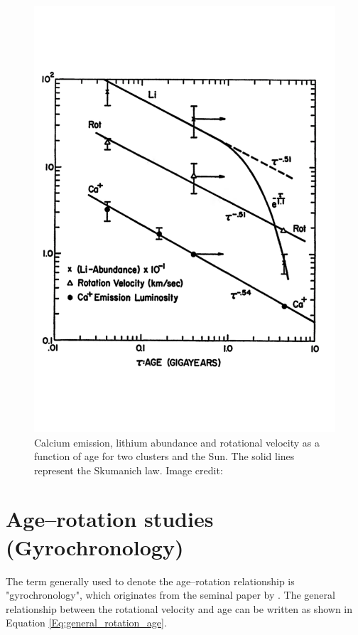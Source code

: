 \begin{figure}
    \centering
    \includegraphics[scale=0.45]{Figures/2-Historical_overview/skumanich_1972.pdf}
    \caption[First plot of age-activity--rotation relationship]{Calcium emission, lithium abundance and rotational velocity as a function of age for two clusters and the Sun. The solid lines represent the Skumanich law. Image credit: \citet{Skumanich_1972}}
    \label{fig:Skumanich_plot}
\end{figure}

\section{Age--rotation studies (Gyrochronology)}
The term generally used to denote the age--rotation relationship is "gyrochronology", which originates from the seminal paper by \citet{Barnes_2003}. The general relationship between the rotational velocity and age can be written as shown in Equation \ref{Eq:general_rotation_age}.

